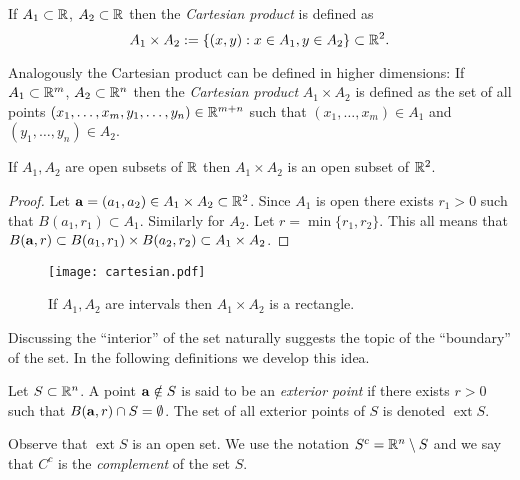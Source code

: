 \begin{definition}
    If \(A_1 \subset \bR\), \(A_2 \subset \bR\) then the \emph{Cartesian product} is defined as
    \[
        A_1 \times A_2 := \left\{(x,y): x \in A_1, y \in A_2\right\}
        \subset \bR^{2}.
    \]
\end{definition}

Analogously the Cartesian product can be defined in higher dimensions:
If \(A_1 \subset \bR^m\), \(A_2 \subset \bR^n\) then the \emph{Cartesian product} \(A_1 \times A_2\) is defined as the set of all points \((x_1,\ldots,x_m,y_1,\ldots,y_n) \in \bR^{m+n}\) such that \((x_1,\ldots,x_m) \in A_1\) and \((y_1,\ldots,y_n) \in A_2\).


\begin{lemma*}
    If \(A_1, A_2\) are open subsets of \(\bR\) then \( A_1 \times A_2 \) is an open subset of \(\bR^2\).
\end{lemma*}
\begin{proof}
    Let \(\aa = (a_1,a_2) \in A_1\times A_2 \subset \bR^2\).
    Since  \(A_1\) is open there  exists \(r_1>0\) such that \(B(a_1,r_1)\subset A_1\).
    Similarly for \(A_2\).
    Let \(r=\min \{r_1,r_2\}\).
    This all means that \(B(\aa,r) \subset B(a_1,r_1) \times B(a_2,r_2) \subset A_1\times A_2\).
\end{proof}


\begin{figure}[htb]
    \begin{centering}
        \texttt{[image: cartesian.pdf]}
        \caption{If \(A_1, A_2\) are intervals then \( A_1 \times A_2 \) is a rectangle.}
    \end{centering}
\end{figure}

Discussing the ``interior'' of the set naturally suggests the topic of the ``boundary'' of the set.
In the following definitions we develop this idea.


\begin{definition}
    Let \(S\subset \bR^n\).
    A point \(\aa \notin S\) is said to be an \emph{exterior point} if there exists \(r>0\) such that \(B(\aa,r)\cap S = \emptyset\).
    The set of all exterior points of \(S\) is denoted \(\operatorname{ext} S\).
\end{definition}

Observe that \(\operatorname{ext} S\) is an open set.
We use the notation \(S^c = \bR^n \setminus S\) and we say that \(C^c\) is the \emph{complement} of the set \(S\).



